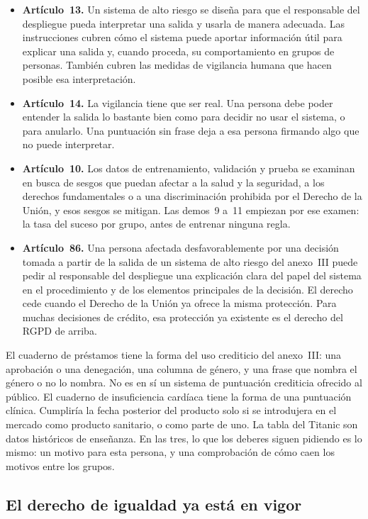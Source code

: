 \documentclass[11pt]{article}
\begin{document}
\begin{itemize}
  \item \textbf{Artículo~13.} Un sistema de alto riesgo se diseña para que el responsable del despliegue pueda interpretar una salida y usarla de manera adecuada. Las instrucciones cubren cómo el sistema puede aportar información útil para explicar una salida y, cuando proceda, su comportamiento en grupos de personas. También cubren las medidas de vigilancia humana que hacen posible esa interpretación.
  \item \textbf{Artículo~14.} La vigilancia tiene que ser real. Una persona debe poder entender la salida lo bastante bien como para decidir no usar el sistema, o para anularlo. Una puntuación sin frase deja a esa persona firmando algo que no puede interpretar.
  \item \textbf{Artículo~10.} Los datos de entrenamiento, validación y prueba se examinan en busca de sesgos que puedan afectar a la salud y la seguridad, a los derechos fundamentales o a una discriminación prohibida por el Derecho de la Unión, y esos sesgos se mitigan. Las demos~9 a~11 empiezan por ese examen: la tasa del suceso por grupo, antes de entrenar ninguna regla.
  \item \textbf{Artículo~86.} Una persona afectada desfavorablemente por una decisión tomada a partir de la salida de un sistema de alto riesgo del anexo~III puede pedir al responsable del despliegue una explicación clara del papel del sistema en el procedimiento y de los elementos principales de la decisión. El derecho cede cuando el Derecho de la Unión ya ofrece la misma protección. Para muchas decisiones de crédito, esa protección ya existente es el derecho del RGPD de arriba.
\end{itemize}

El cuaderno de préstamos tiene la forma del uso crediticio del anexo~III: una aprobación o una denegación, una columna de género, y una frase que nombra el género o no lo nombra. No es en sí un sistema de puntuación crediticia ofrecido al público. El cuaderno de insuficiencia cardíaca tiene la forma de una puntuación clínica. Cumpliría la fecha posterior del producto solo si se introdujera en el mercado como producto sanitario, o como parte de uno. La tabla del Titanic son datos históricos de enseñanza. En las tres, lo que los deberes siguen pidiendo es lo mismo: un motivo para esta persona, y una comprobación de cómo caen los motivos entre los grupos.

\subsection{El derecho de igualdad ya está en vigor}
\end{document}
